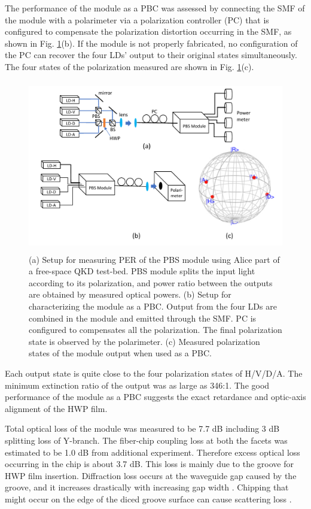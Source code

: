 \documentclass[letterpaper, 10pt]{article}
\begin{document}
The performance of the module as a PBC was assessed by connecting the SMF of the module with a polarimeter via a polarization controller (PC) that is configured to compensate the polarization distortion occurring in the SMF, as shown in Fig. \ref{fig:meas_setup}(b).
If the module is not properly fabricated, no configuration of the PC can recover the four LDs' output to their original states simultaneously.
The four states of the polarization measured are shown in Fig. \ref{fig:meas_setup}(c).
\begin{figure}
  \centering
  \includegraphics[height=7.5cm]{meas_setup}
  \caption{(a) Setup for measuring PER of the PBS module using Alice part of a free-space QKD test-bed. PBS module splits the input light according to its polarization, and power ratio between the outputs are obtained by measured optical powers.  (b) Setup for characterizing the module as a PBC. Output from the four LDs are combined in the module and emitted through the SMF. PC is configured to compensates all the polarization. The final polarization state  is observed by the polarimeter. (c) Measured polarization states of the module output when used as a PBC.}
  \label{fig:meas_setup}
\end{figure}
Each output state is quite close to the four polarization states of H/V/D/A.
The minimum extinction ratio of the output was as large as 346:1.
The good performance of the module as a PBC suggests the exact retardance and optic-axis alignment of the HWP film.



Total optical  loss of the module was measured to be 7.7 dB including 3 dB splitting loss of Y-branch.
The fiber-chip coupling loss at both the facets was estimated to be 1.0 dB from additional experiment.
Therefore excess optical loss occurring in the chip is about 3.7 dB.
This loss is mainly due to the groove for HWP film insertion.
Diffraction loss occurs at the waveguide gap caused by the groove, and it increases drastically with increasing gap width \cite{Inoue:1997es}.
Chipping that might occur on the edge of the diced groove surface can cause scattering loss \cite{Carpenter:2013fh}.
\end{document}
